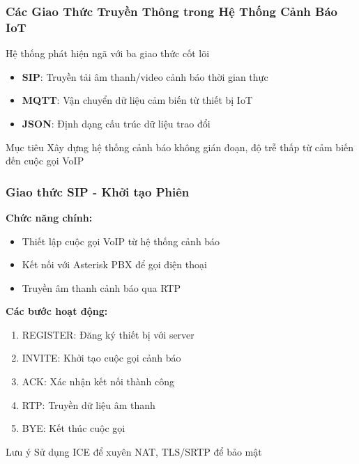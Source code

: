 
\begin{frame}
\frametitle{Các Giao Thức Truyền Thông trong Hệ Thống Cảnh Báo IoT}
\begin{center}
\Large Hệ thống phát hiện ngã với ba giao thức cốt lõi
\end{center}

\begin{itemize}
\item \textbf{SIP}: Truyền tải âm thanh/video cảnh báo thời gian thực
\item \textbf{MQTT}: Vận chuyển dữ liệu cảm biến từ thiết bị IoT  
\item \textbf{JSON}: Định dạng cấu trúc dữ liệu trao đổi
\end{itemize}

\begin{block}{Mục tiêu}
Xây dựng hệ thống cảnh báo không gián đoạn, độ trễ thấp từ cảm biến đến cuộc gọi VoIP
\end{block}
\end{frame}

\begin{frame}
\frametitle{Giao thức SIP - Khởi tạo Phiên}
\textbf{Chức năng chính:}
\begin{itemize}
\item Thiết lập cuộc gọi VoIP từ hệ thống cảnh báo
\item Kết nối với Asterisk PBX để gọi điện thoại
\item Truyền âm thanh cảnh báo qua RTP
\end{itemize}
\textbf{Các bước hoạt động:}
\begin{enumerate}
\item REGISTER: Đăng ký thiết bị với server
\item INVITE: Khởi tạo cuộc gọi cảnh báo
\item ACK: Xác nhận kết nối thành công
\item RTP: Truyền dữ liệu âm thanh
\item BYE: Kết thúc cuộc gọi
\end{enumerate}
\begin{alertblock}{Lưu ý}
Sử dụng ICE để xuyên NAT, TLS/SRTP để bảo mật
\end{alertblock}
\end{frame}

